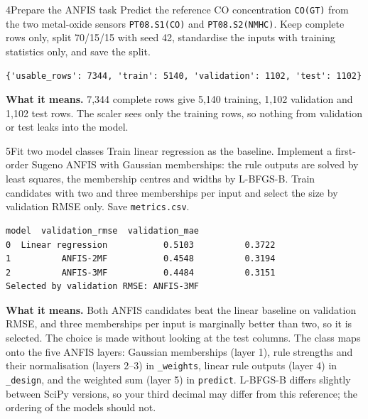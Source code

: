 \begin{labquestion}{4}{Prepare the ANFIS task}
Predict the reference CO concentration \texttt{CO(GT)} from the two metal-oxide sensors \texttt{PT08.S1(CO)} and \texttt{PT08.S2(NMHC)}. Keep complete rows only, split 70/15/15 with seed 42, standardise the inputs with training statistics only, and save the split.
\end{labquestion}
\begin{labanswer}

\begin{refoutput}
\begin{lstlisting}[style=utpterminal]
{'usable_rows': 7344, 'train': 5140, 'validation': 1102, 'test': 1102}
\end{lstlisting}
\end{refoutput}

\textbf{What it means.} 7,344 complete rows give 5,140 training, 1,102 validation and 1,102 test rows. The scaler sees only the training rows, so nothing from validation or test leaks into the model.
\end{labanswer}

\begin{labquestion}{5}{Fit two model classes}
Train linear regression as the baseline. Implement a first-order Sugeno ANFIS with Gaussian memberships: the rule outputs are solved by least squares, the membership centres and widths by L-BFGS-B. Train candidates with two and three memberships per input and select the size by validation RMSE only. Save \texttt{metrics.csv}.
\end{labquestion}
\begin{labanswer}

\begin{refoutput}
\begin{lstlisting}[style=utpterminal]
               model  validation_rmse  validation_mae
0  Linear regression           0.5103          0.3722
1          ANFIS-2MF           0.4548          0.3194
2          ANFIS-3MF           0.4484          0.3151
Selected by validation RMSE: ANFIS-3MF
\end{lstlisting}
\end{refoutput}

\textbf{What it means.} Both ANFIS candidates beat the linear baseline on validation RMSE, and three memberships per input is marginally better than two, so it is selected. The choice is made without looking at the test columns. The class maps onto the five ANFIS layers: Gaussian memberships (layer 1), rule strengths and their normalisation (layers 2--3) in \texttt{\_weights}, linear rule outputs (layer 4) in \texttt{\_design}, and the weighted sum (layer 5) in \texttt{predict}. L-BFGS-B differs slightly between SciPy versions, so your third decimal may differ from this reference; the ordering of the models should not.
\end{labanswer}


